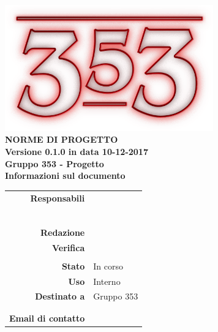 \documentclass[openany, a4paper, 12pt]{report}
\begin{document}
\begin{titlepage}
	\centering
	\vfill
	{
		\bfseries
		\vskip2cm
		\includegraphics[width=9cm]{../../common/images/logo.png} \\
		\vfill
		\Huge{NORME DI PROGETTO}\\
		\vfill
		\Large Versione 0.1.0 in data 10-12-2017\\
		\large Gruppo 353 - Progetto \progetto \\
		\vfill
		\normalsize Informazioni sul documento\\
		\begin{table}[htbp]
			\centering
			\renewcommand\arraystretch{1.2}
			\begin{tabular}{r|l}
				\hline
				\textbf{Responsabili}	& \Elena\\
										& \Valentina\\
										& \Mirco\\
										& \Riccardo\\
										& \Gianluca\\
										& \Parwinder\\
										& \Davide\\
				
				\textbf{Redazione} 		& \\
				\textbf{Verifica} 		& \Davide \\
										& \Riccardo \\	
				
				\textbf{Stato} 			& In corso\\
				\textbf{Uso}			& Interno\\
				\textbf{Destinato a}   	& Gruppo 353\\
										& \Vardanega\\
										& \Cardin\\
				
				\textbf{Email di contatto}	& \mailleaf
			\end{tabular}
		\end{table}
		\vfill
	}    
\end{titlepage}

\tableofcontents
\newpage
{}




 
\end{document}
